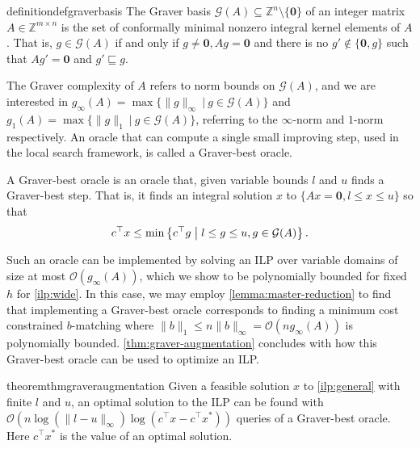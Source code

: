 \documentclass[a4paper,UKenglish,cleveref,thm-restate]{lipics-v2021}
\newcommand{\Z}{\mathbb Z}
\newcommand{\veczero}{\mathbf0}
\renewcommand{\O}{\mathcal O}
\newcommand{\G}{\mathcal G}
\begin{document}
\begin{restatable}{definition}{defgraverbasis}
    The Graver basis $\G(A)\subseteq\Z^n\setminus\{\veczero\}$ of an integer matrix $A\in\Z^{m\times n}$ is the set of conformally minimal nonzero integral kernel elements of $A$. That is, $g\in\G(A)$ if and only if $g\ne\veczero,Ag=\veczero$ and there is no $g'\notin\{\veczero,g\}$ such that $Ag'=\veczero$ and $g'\sqsubseteq g$.\\
    \label{def:graver-basis}
\end{restatable}

The Graver complexity of $A$ refers to norm bounds on $\G(A)$, and we are interested in $g_\infty(A)=\max\{\|g\|_\infty\ \vert\ g\in\G(A)\}$ and $g_1(A)=\max\{\|g\|_1\ \vert\ g\in\G(A)\}$, referring to the $\infty$-norm and $1$-norm respectively. An oracle that can compute a single small improving step, used in the local search framework, is called a Graver-best oracle.

\begin{definition}
    A Graver-best oracle is an oracle that, given variable bounds $l$ and $u$ finds a Graver-best step. That is, it finds an integral solution $x$ to $\{Ax=\veczero,l\le x\le u\}$ so that
    \[
        c^\top x\le\min\left\{c^\top g\bigm\vert l\le g\le u,g\in\G(A)\right\}.
    \]
    \label{def:graver-best-oracle}
\end{definition}

Such an oracle can be implemented by solving an ILP over variable domains of size at most $\O(g_\infty(A))$, which we show to be polynomially bounded for fixed $h$ for \cref{ilp:wide}. In this case, we may employ \cref{lemma:master-reduction} to find that implementing a Graver-best oracle corresponds to finding a minimum cost constrained $b$-matching where $\|b\|_1\le n\|b\|_\infty=\O(ng_\infty(A))$ is polynomially bounded. \cref{thm:graver-augmentation} concludes with how this Graver-best oracle can be used to optimize an ILP.

\begin{restatable}{theorem}{thmgraveraugmentation}
    Given a feasible solution $x$ to \cref{ilp:general} with finite $l$ and $u$, an optimal solution to the ILP can be found with $\O(n\log(\|l-u\|_\infty)\log(c^\top x-c^\top x^*))$ queries of a Graver-best oracle. Here $c^\top x^*$ is the value of an optimal solution.
    \label{thm:graver-augmentation}
\end{restatable}
\end{document}
